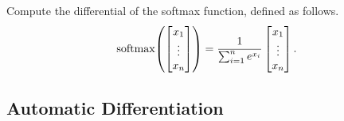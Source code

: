 \documentclass[../../book-main.tex]{subfiles}
\begin{document}
\begin{exercise}
    Compute the differential of the softmax function, defined as follows.
    \begin{equation}
        \softmax\rp{\mat{x_{1} \\ \vdots \\ x_{n}}} = \frac{1}{\sum_{i = 1}^{n}e^{x_{i}}}\mat{x_{1} \\ \vdots \\ x_{n}}.
    \end{equation}
\end{exercise}


\subsection{Automatic Differentiation}
\end{document}
